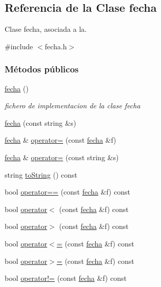 \hypertarget{classfecha}{\subsection{Referencia de la Clase fecha}
\label{classfecha}
}


Clase fecha, asociada a la.  




{\ttfamily \#include $<$fecha.\-h$>$}

\subsubsection*{Métodos públicos}
\begin{DoxyCompactItemize}
\item 
\hyperlink{classfecha_a6775ef84b5838e12e28fd341793f4539}{fecha} ()
\begin{DoxyCompactList}\small\item\em fichero de implementacion de la clase fecha \end{DoxyCompactList}\item 
\hyperlink{classfecha_aed5c22d5eeb15f1f2927d5a2c28b74df}{fecha} (const string \&s)
\item 
\hyperlink{classfecha}{fecha} \& \hyperlink{classfecha_ac7f5398b71cbccc4cd74f8c5e56b80ce}{operator=} (const \hyperlink{classfecha}{fecha} \&f)
\item 
\hyperlink{classfecha}{fecha} \& \hyperlink{classfecha_adf0cb1494d557581d89e3289ab121bc5}{operator=} (const string \&s)
\item 
string \hyperlink{classfecha_a26d22b980284408eac0da084f358c43b}{to\-String} () const 
\item 
bool \hyperlink{classfecha_ac971e131a6e3edf57c2313468524f364}{operator==} (const \hyperlink{classfecha}{fecha} \&f) const 
\item 
bool \hyperlink{classfecha_a27803300b9698e1a40ef48f2009948c5}{operator$<$} (const \hyperlink{classfecha}{fecha} \&f) const 
\item 
bool \hyperlink{classfecha_aaded7646e80d88492b31b17b4fb001fd}{operator$>$} (const \hyperlink{classfecha}{fecha} \&f) const 
\item 
bool \hyperlink{classfecha_a8dfb2f2a7424bdb1dacc6df122b0a0c8}{operator$<$=} (const \hyperlink{classfecha}{fecha} \&f) const 
\item 
bool \hyperlink{classfecha_a98d0f3009cb7205b5ddb3b81596d9cc7}{operator$>$=} (const \hyperlink{classfecha}{fecha} \&f) const 
\item 
bool \hyperlink{classfecha_a1f6d28759c45b138efb80d25a7c398b8}{operator!=} (const \hyperlink{classfecha}{fecha} \&f) const 
\end{DoxyCompactItemize}
